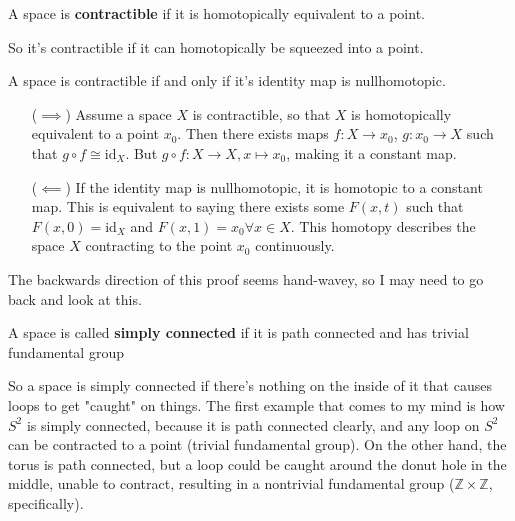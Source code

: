 \documentclass[12pt]{article}
\newcommand{\Z}{\mathbb{Z}}
\begin{document}
\begin{definition}
  A space is \textbf{contractible} if it is homotopically equivalent to a point. 
\end{definition}

So it's contractible if it can homotopically be squeezed into a point. 

\begin{theorem}
  A space is contractible if and only if it's identity map is nullhomotopic.
\end{theorem}
\begin{newproof}
  \begin{itemize}
    \item[($\implies$)] Assume a space $X$ is contractible, so that $X$ is homotopically equivalent to a point $x_0$. 
      Then there exists maps $f: X \to x_0$, $g:x_0 \to X$ such that $g \circ f \cong \text{id}_X$. But $g \circ f: X 
      \to X, x \mapsto x_0$, making it a constant map.
    \item[($\impliedby$)] If the identity map is nullhomotopic, it is homotopic to a constant map. This is 
      equivalent to saying there exists some $F(x,t)$ such that $F(x,0) = \text{id}_X$ and $F(x,1) = x_0 \forall x \in X$.
      This homotopy describes the space $X$ contracting to the point $x_0$ continuously.
  \end{itemize}
\end{newproof}

The backwards direction of this proof seems hand-wavey, so I may need to go back and look at this. 

\begin{definition}
  A space is called \textbf{simply connected} if it is path connected and has trivial fundamental group
\end{definition}

So a space is simply connected if there's nothing on the inside of it that causes loops to get "caught" on 
things. The first example that comes to my mind is how $S^2$ is simply connected, because it is path connected clearly, 
and any loop on $S^2$ can be contracted to a point (trivial fundamental group). On the other hand, the torus is path
connected, but a loop could be caught around the donut hole in the middle, unable to contract, resulting in a nontrivial 
fundamental group ($\Z \times \Z$, specifically).
\end{document}
